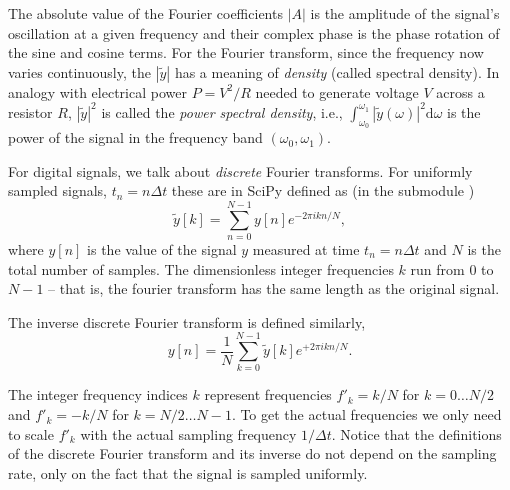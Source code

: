 The absolute value of the Fourier coefficients $|A|$ is the amplitude of the signal's oscillation at a given frequency and their complex phase is the phase rotation of the sine and cosine terms. For the Fourier transform, since the frequency now varies continuously, the $|\tilde y|$ has a meaning of \emph{density} (called spectral density). In analogy with electrical power $P = V^2/R$ needed to generate voltage $V$ across a resistor $R$, $|\tilde y|^2$ is called the \emph{power spectral density}, i.e., $\int_{\omega_0}^{\omega_1} |\tilde y (\omega)|^2\mathrm{d}\omega$ is the power of the signal in the frequency band $(\omega_0, \omega_1)$.

For digital signals, we talk about \emph{discrete} Fourier transforms. For uniformly sampled signals, $t_n = n\Delta t$ these are in SciPy defined as (in the submodule )
\begin{equation}
    \tilde y[k] = \sum_{n=0}^{N-1}y[n]e^{-2\pi i kn/N},
\end{equation}
where $y[n]$ is the value of the signal $y$ measured at time $t_n = n\Delta t$ and $N$ is the total number of samples. The dimensionless integer frequencies $k$ run from 0 to $N-1$ -- that is, the fourier transform has the same length as the original signal. 

The inverse discrete Fourier transform is defined similarly,
\begin{equation}
    y[n] = \frac{1}{N}\sum_{k=0}^{N-1}\tilde y[k]e^{+2\pi i kn/N}.
\end{equation}

The integer frequency indices $k$ represent frequencies $f'_k = k/N$ for $k=0\dots N/2$ and $f'_k = -k/N$ for $k=N/2\dots N-1$. To get the actual frequencies we only need to scale $f'_k$ with the actual sampling frequency $1/\Delta t$. Notice that the definitions of the discrete Fourier transform and its inverse do not depend on the sampling rate, only on the fact that the signal is sampled uniformly.

